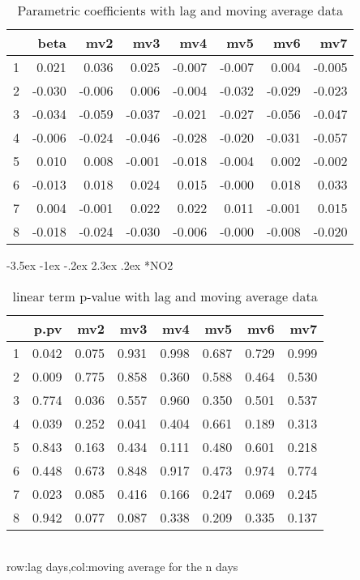 \documentclass[a4paper, 12pt]{article}
\makeatletter
\def\large{\fontsize{14}{20}\selectfont}
\renewcommand\subsection{\@startsection {subsection}{1}{\z@}%
                                   {-3.5ex \@plus -1ex \@minus -.2ex}%
                                   {2.3ex \@plus.2ex}%
                                   {\centering\normalfont\large\bfseries}}
\makeatother
\begin{document}
\begin{table}[h]
\centering
\caption{Parametric coefficients with lag and moving average data}
\begin{tabular}{rrrrrrrr}
  \hline
 & beta & mv2 & mv3 & mv4 & mv5 & mv6 & mv7 \\
  \hline
1 & 0.021 & 0.036 & 0.025 & -0.007 & -0.007 & 0.004 & -0.005 \\
  2 & -0.030 & -0.006 & 0.006 & -0.004 & -0.032 & -0.029 & -0.023 \\
  3 & -0.034 & -0.059 & -0.037 & -0.021 & -0.027 & -0.056 & -0.047 \\
  4 & -0.006 & -0.024 & -0.046 & -0.028 & -0.020 & -0.031 & -0.057 \\
  5 & 0.010 & 0.008 & -0.001 & -0.018 & -0.004 & 0.002 & -0.002 \\
  6 & -0.013 & 0.018 & 0.024 & 0.015 & -0.000 & 0.018 & 0.033 \\
  7 & 0.004 & -0.001 & 0.022 & 0.022 & 0.011 & -0.001 & 0.015 \\
  8 & -0.018 & -0.024 & -0.030 & -0.006 & -0.000 & -0.008 & -0.020 \\
   \hline
\end{tabular}
\end{table}
\clearpage
\subsection*{NO2}
\begin{table}[h]
\centering
\caption{linear term p-value with lag and moving average data}
\begin{tabular}{rrrrrrrr}
  \hline
 & p.pv & mv2 & mv3 & mv4 & mv5 & mv6 & mv7 \\
  \hline
1 & 0.042 & 0.075 & 0.931 & 0.998 & 0.687 & 0.729 & 0.999 \\
  2 & 0.009 & 0.775 & 0.858 & 0.360 & 0.588 & 0.464 & 0.530 \\
  3 & 0.774 & 0.036 & 0.557 & 0.960 & 0.350 & 0.501 & 0.537 \\
  4 & 0.039 & 0.252 & 0.041 & 0.404 & 0.661 & 0.189 & 0.313 \\
  5 & 0.843 & 0.163 & 0.434 & 0.111 & 0.480 & 0.601 & 0.218 \\
  6 & 0.448 & 0.673 & 0.848 & 0.917 & 0.473 & 0.974 & 0.774 \\
  7 & 0.023 & 0.085 & 0.416 & 0.166 & 0.247 & 0.069 & 0.245 \\
  8 & 0.942 & 0.077 & 0.087 & 0.338 & 0.209 & 0.335 & 0.137 \\
   \hline
\end{tabular}
\\row:lag days,col:moving average for the n days
\end{table}
\end{document}
